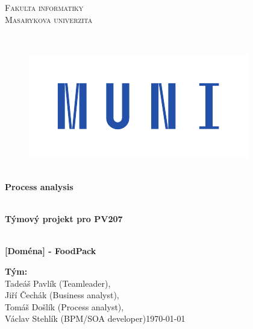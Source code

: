 \documentclass[11pt,a4paper]{article}
\begin{document}
\begin{titlepage}

    \begin{center}
        \vfill {%
            \Huge{%
                \textsc{%
                    Fakulta informatiky\\[3mm]%
                    Masarykova univerzita%
                }%
            }%
        }%

        \hfill\\[15mm]

        \begin{figure}[!h]
            \centering
            \includegraphics[scale=2]{muni-lg-cmyk.pdf}
        \end{figure}

        \hfill\\[10mm]

        \Huge{
            \textbf{
                Process analysis
            }
        }

        \hfill\\[-10mm]

        \huge{
            \textbf{
                Týmový projekt pro PV207
            }
        }

        \hfill\\[10mm]

        \LARGE{
            \textbf{
                [Doména] - FoodPack
            }
        }
        \vfill

    \end{center}

        \Large{
            \textbf{Tým:}\\Tadeáš Pavlík (Teamleader),\\Jiří Čechák (Business analyst),\\Tomáš Došlík (Process analyst),\\Václav Stehlík (BPM/SOA developer)\hfill \today
        }

\end{titlepage}
\end{document}
